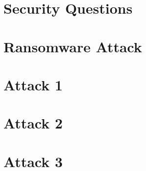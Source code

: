 

\section{Security Questions}



\section{Ransomware Attack}


\section{Attack 1}


\section{Attack 2}


\section{Attack 3}
